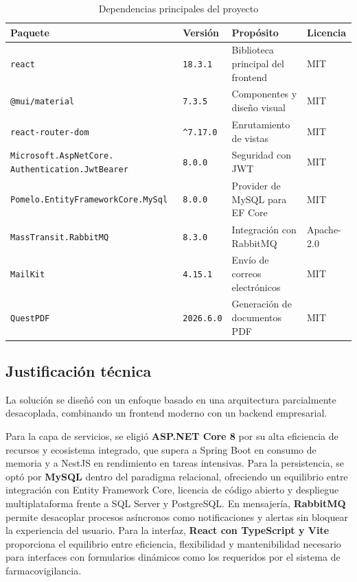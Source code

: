 \documentclass[12pt,letterpaper]{article}
\begin{document}
	\begin{table}[H]
		\centering
		\caption{Dependencias principales del proyecto}
		\label{tab:deps}
		\begin{tabular}{|p{7cm}|l|p{5cm}|p{2cm}|}
			\hline
			\textbf{Paquete} & \textbf{Versión} & \textbf{Propósito} & \textbf{Licencia} \\ \hline
			\texttt{react} & \verb|18.3.1| & Biblioteca principal del frontend & MIT \\ \hline
			\texttt{@mui/material} & \verb|7.3.5| & Componentes y diseño visual & MIT \\ \hline
			\texttt{react-router-dom} & \verb|^7.17.0| & Enrutamiento de vistas & MIT \\ \hline
			\texttt{Microsoft.AspNetCore.} \newline \texttt{Authentication.JwtBearer} & \verb|8.0.0| & Seguridad con JWT & MIT \\ \hline
			
			\texttt{Pomelo.EntityFrameworkCore.MySql} & \verb|8.0.0| & Provider de MySQL para EF Core & MIT \\ \hline
			\texttt{MassTransit.RabbitMQ} & \verb|8.3.0| & Integración con RabbitMQ & Apache-2.0 \\ \hline
			\texttt{MailKit} & \verb|4.15.1| & Envío de correos electrónicos & MIT \\ \hline
			\texttt{QuestPDF} & \verb|2026.6.0| & Generación de documentos PDF & MIT \\ \hline
		\end{tabular}
	\end{table}
	
	\subsection{Justificación técnica}
	
	La solución se diseñó con un enfoque basado en una arquitectura parcialmente desacoplada, combinando un frontend moderno con un backend empresarial. 
	
	Para la capa de servicios, se eligió \textbf{ASP.NET Core 8} por su alta eficiencia de recursos y ecosistema integrado, que supera a Spring Boot en consumo de memoria y a NestJS en rendimiento en tareas intensivas. 
	Para la persistencia, se optó por \textbf{MySQL} dentro del paradigma relacional, ofreciendo un equilibrio entre integración con Entity Framework Core, licencia de código abierto y despliegue multiplataforma frente a SQL Server y PostgreSQL. En mensajería, \textbf{RabbitMQ} permite desacoplar procesos asíncronos como notificaciones y alertas sin bloquear la experiencia del usuario. Para la interfaz, \textbf{React con TypeScript y Vite} proporciona el equilibrio entre eficiencia, flexibilidad y mantenibilidad necesario para interfaces con formularios dinámicos como los requeridos por el sistema de farmacovigilancia.
\end{document}
